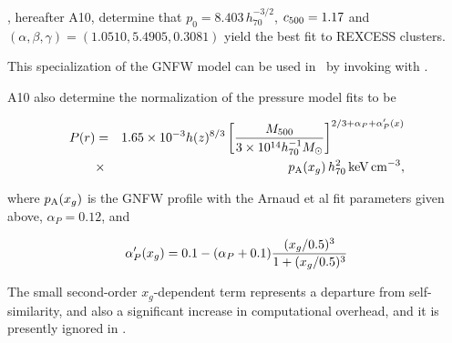 \cite{arnaud2010}, hereafter A10, determine that $p_0 =
8.403\,h^{-3/2}_{70}$, $c_{\rm 500} = 1.17$ and $(\alpha,\beta,\gamma)
= (1.0510, 5.4905, 0.3081)$ yield the best fit to REXCESS clusters.

This specialization of the GNFW model can be used in \climax\ by
invoking  with .

A10 also determine the normalization of the pressure model fits to be

\begin{eqnarray}
P(r) &=&
1.65\times10^{-3}h(z)^{8/3}\left[{\M500\over{3\times10^{14}h^{-1}_{70}\Msolar}}\right]^{2/3+\alpha_P+\alpha^\prime_P(x)}\\\nonumber
&\times& p_{\rm A}(x_g) \,h^2_{70}\,{\rm keV\,cm^{-3}},
\end{eqnarray}

where $p_{\rm A}(x_g)$ is the GNFW profile with the Arnaud et al fit
parameters given above, $\alpha_P = 0.12$, and

\begin{equation}
\alpha^\prime_P(x_g) = 0.1 - (\alpha_P + 0.1){{(x_g/0.5)^3}\over{1 + (x_g/0.5)^3}}
\end{equation}

The small second-order $x_g$-dependent term represents a departure
from self-similarity, and also a significant increase in computational
overhead, and it is presently ignored in \climax.

